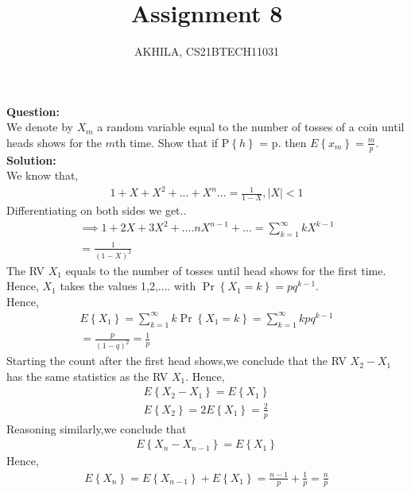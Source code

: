 \documentclass[journal,12pt,twocolumn]{IEEEtran}
\title{Assignment 8}
\author{AKHILA, CS21BTECH11031}
\newcommand{\question}{\noindent \textbf{Question: }}
\newcommand{\solution}{\noindent \textbf{Solution: }}
\providecommand{\cbrak}[1]{\ensuremath{\left\{#1\right\}}}
\providecommand{\brak}[1]{\ensuremath{\left(#1\right)}}
\providecommand{\pd}[1]{\ensuremath{\Pr\left\{#1\right\}}}
\begin{document}
\maketitle
\question\\
We denote by $X_m$ a random variable equal to the number of tosses of a coin until heads shows 
for the $m$th time. Show that if P\cbrak{h} = p. then $E\cbrak{x_m}=\frac{m}{p}$. \\ 

\solution\\

We know that,
\begin{align}
    1+X+X^2+...+X^n...=\frac{1}{1-X} ,|X| < 1
\end{align}
Differentiating on both sides we get..
\begin{align}
    \implies 1+2X+3X^2+....nX^{n-1}+...=\sum_{k=1}^\infty kX^{k-1}\\=\frac{1}{\brak{1-X}^2}
\end{align}
The RV $X_1$ equals to the number of tosses until head shows for the first time.\\Hence, $X_1$ takes the values 1,2,.... with  $\pd{X_1=k}=pq^{k-1}$. \\Hence,
\begin{align}
    E\cbrak{X_1}=\sum_{k=1}^\infty k\pd{X_1= k}=\sum_{k=1}^\infty kpq^{k-1}\\
    =\frac{p}{(1-q)^2}=\frac{1}{p}
\end{align}
Starting the count after the first head shows,we conclude that the RV $X_2-X_1$ has the same statistics as the RV $X_1$. Hence, 
\begin{align}
   E\cbrak{X_2-X_1}=E\cbrak{X_1}\\
   E\cbrak{X_2}=2E\cbrak{X_1}=\frac{2}{p}
\end{align}
Reasoning similarly,we conclude that 
\begin{align}
    E\cbrak{X_n-X_{n-1}}=E\cbrak{X_1}
\end{align}
Hence,
\begin{align}
    E\cbrak{X_n}=E\cbrak{X_{n-1}}+E\cbrak{X_1}=\frac{n-1}{p}+\frac{1}{p}=\frac{n}{p}
\end{align}
\end{document}
